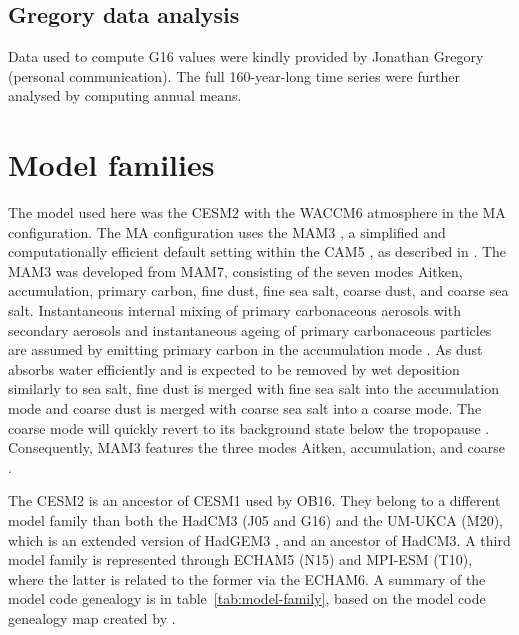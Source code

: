 \documentclass[draft]{agujournal2019}
\begin{document}
\subsection{Gregory data analysis}\label{ap:g16}

Data used to compute G16 values were kindly provided by Jonathan Gregory (personal
communication). The full 160-year-long time series were further analysed by computing
annual means.

\section{Model families}

The model used here was the CESM2 with the WACCM6 atmosphere in the MA configuration.
The MA configuration uses the MAM3 \cite{gettleman2019}, a simplified and
computationally efficient default setting within the CAM5 \cite{liu2016}, as described
in . The MAM3 was developed from MAM7, consisting of the seven modes
Aitken, accumulation, primary carbon, fine dust, fine sea salt, coarse dust, and coarse
sea salt. Instantaneous internal mixing of primary carbonaceous aerosols with secondary
aerosols and instantaneous ageing of primary carbonaceous particles are assumed by
emitting primary carbon in the accumulation mode \cite{liu2016}. As dust absorbs water
efficiently and is expected to be removed by wet deposition similarly to sea salt, fine
dust is merged with fine sea salt into the accumulation mode and coarse dust is merged
with coarse sea salt into a coarse mode. The coarse mode will quickly revert to its
background state below the tropopause \cite{liu2012}. Consequently, MAM3 features the
three modes Aitken, accumulation, and coarse \cite{liu2016}.

The CESM2 is an ancestor of CESM1 used by OB16. They belong to a different model family
than both the HadCM3 (J05 and G16) and the UM-UKCA (M20), which is an extended version
of HadGEM3 \cite{dhomse2014}, and an ancestor of HadCM3. A third model family is
represented through ECHAM5 (N15) and MPI-ESM (T10), where the latter is related to the
former via the ECHAM6. A summary of the model code genealogy is in
table~\ref{tab:model-family}, based on the model code genealogy map created by
.
\end{document}
